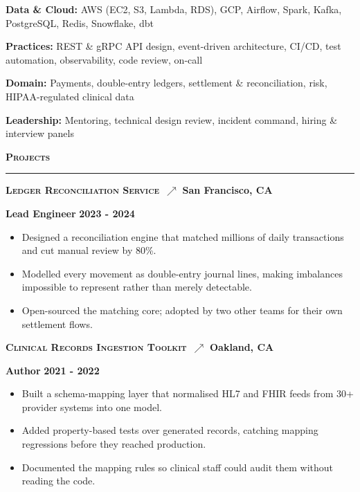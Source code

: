 \documentclass{article}
\newcommand{\vs}{\vspace{0.3cm}}
\begin{document}
\noindent \textbf{Data \& Cloud:} AWS (EC2, S3, Lambda, RDS), GCP, Airflow, Spark, Kafka, PostgreSQL, Redis, Snowflake, dbt

\noindent \textbf{Practices:} REST \& gRPC API design, event-driven architecture, CI/CD, test automation, observability, code review, on-call

\noindent \textbf{Domain:} Payments, double-entry ledgers, settlement \& reconciliation, risk, HIPAA-regulated clinical data

\noindent \textbf{Leadership:} Mentoring, technical design review, incident command, hiring \& interview panels
\vs

\noindent \textbf{\textsc{\large Projects}}

\noindent \rule[3pt]{\textwidth}{1pt}

\noindent \textbf{\textsc{Ledger Reconciliation Service}}~\href{https://github.com/jordanrivera/ledger}{$\nearrow$} \hfill \textbf{San Francisco, CA}

\noindent \textbf{Lead Engineer} \hfill \textbf{2023 - 2024}
\begin{itemize}
	\item Designed a reconciliation engine that matched millions of daily transactions and cut manual review by 80\%.
	\item Modelled every movement as double-entry journal lines, making imbalances impossible to represent rather than merely detectable.
	\item Open-sourced the matching core; adopted by two other teams for their own settlement flows.
\end{itemize}

\noindent \textbf{\textsc{Clinical Records Ingestion Toolkit}}~\href{https://github.com/jordanrivera/ingest}{$\nearrow$} \hfill \textbf{Oakland, CA}

\noindent \textbf{Author} \hfill \textbf{2021 - 2022}
\begin{itemize}
	\item Built a schema-mapping layer that normalised HL7 and FHIR feeds from 30+ provider systems into one model.
	\item Added property-based tests over generated records, catching mapping regressions before they reached production.
	\item Documented the mapping rules so clinical staff could audit them without reading the code.
\end{itemize}
\vs
\end{document}

